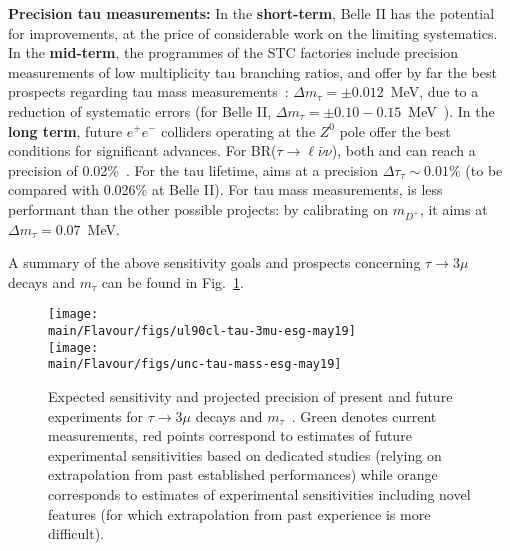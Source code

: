 {\bf Precision tau measurements:}
In the {\bf short-term}, Belle II has the potential for improvements,
at the price of considerable work on the limiting systematics. 
In the {\bf mid-term}, the programmes of the STC factories include precision
measurements of low multiplicity tau branching ratios, and
offer by far the best prospects regarding tau mass measurements~\cite{Bondar:2013cja,Novosibirsk_SCT_input,Luo:2018njj,Peng:2018}: 
$\Delta m_\tau = \pm 0.012$~MeV, due to a reduction of systematic errors
(for Belle II, 
$\Delta m_\tau = 
\pm 0.10 - 0.15$~MeV~\cite{Kou:2018nap}). 
In the {\bf long term}, future $e^+ e^-$ colliders operating at the $Z^0$
pole offer the best conditions for significant advances. 
For BR($\tau \to \ell \bar \nu\nu$), 
 both \FCCee and \CEPC can
reach a precision of 0.02\%~\cite{Blondel:2019yqr,CEPC_INPUT}. For the tau lifetime, 
\FCCee aims at a precision  
$\Delta \tau_\tau \sim 0.01\%$ 
(to be compared with 0.026\% at Belle II). For tau mass measurements, \FCCee is less performant than the other possible projects: 
by calibrating on $m_{D^+}$, it aims at 
$\Delta m_\tau = 0.07$~MeV.


A  summary of the above sensitivity goals and prospects concerning $\tau \to 3\mu$ decays and $m_\tau$ can be found in Fig.~\ref{fig:Lusiani_prospects}.

\begin{figure}
\centering
\hspace*{-3mm}
\texttt{[image: \\main/Flavour/figs/ul90cl-tau-3mu-esg-may19]} 
\vspace*{3mm}\\
\texttt{[image: \\main/Flavour/figs/unc-tau-mass-esg-may19]} 
\caption{Expected sensitivity and projected precision of  present and future experiments for $\tau \to 3\mu$ decays and $m_\tau$~\cite{LusianiESPP19}.
Green denotes current measurements, red  points correspond to estimates of future experimental sensitivities based on dedicated studies (relying on extrapolation from past established performances) while orange corresponds to estimates of experimental sensitivities including novel features (for which extrapolation from past experience is more difficult). }\label{fig:Lusiani_prospects} 
\end{figure}
